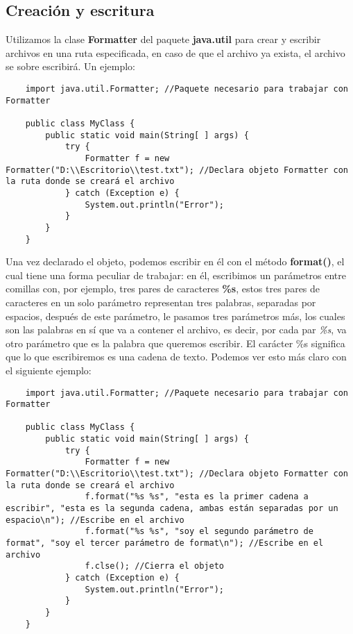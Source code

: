\subsection{Creación y escritura}
Utilizamos la clase \textbf{Formatter} del paquete \textbf{java.util} para crear y escribir archivos en una ruta especificada, en caso de que el archivo ya exista, el archivo se sobre escribirá. Un ejemplo:
\begin{lstlisting}
    import java.util.Formatter; //Paquete necesario para trabajar con Formatter

    public class MyClass {
        public static void main(String[ ] args) {
            try {
                Formatter f = new Formatter("D:\\Escritorio\\test.txt"); //Declara objeto Formatter con la ruta donde se creará el archivo
            } catch (Exception e) {
                System.out.println("Error");
            }
        }
    }
\end{lstlisting}
Una vez declarado el objeto, podemos escribir en él con el método \textbf{format()}, el cual tiene una forma peculiar de trabajar: en él, escribimos un parámetros entre comillas con, por ejemplo, tres pares de caracteres \textbf{\%s}, estos tres pares de caracteres en un solo parámetro representan tres palabras, separadas por espacios, después de este parámetro, le pasamos tres parámetros más, los cuales son las palabras en sí que va a contener el archivo, es decir, por cada par \textit{\%s}, va otro parámetro que es la palabra que queremos escribir. El carácter \%s significa que lo que escribiremos es una cadena de texto. Podemos ver esto más claro con el siguiente ejemplo:
\begin{lstlisting}
    import java.util.Formatter; //Paquete necesario para trabajar con Formatter

    public class MyClass {
        public static void main(String[ ] args) {
            try {
                Formatter f = new Formatter("D:\\Escritorio\\test.txt"); //Declara objeto Formatter con la ruta donde se creará el archivo
                f.format("%s %s", "esta es la primer cadena a escribir", "esta es la segunda cadena, ambas están separadas por un espacio\n"); //Escribe en el archivo
                f.format("%s %s", "soy el segundo parámetro de format", "soy el tercer parámetro de format\n"); //Escribe en el archivo
                f.clse(); //Cierra el objeto
            } catch (Exception e) {
                System.out.println("Error");
            }
        }
    }
\end{lstlisting}